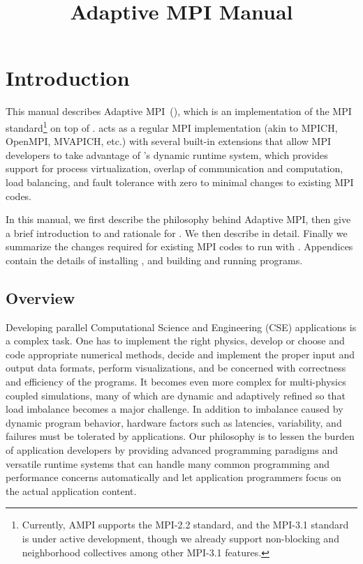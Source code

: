 \documentclass[10pt]{article}
\title{Adaptive MPI Manual}
\begin{document}
\maketitle

\section{Introduction}

This manual describes Adaptive MPI~(\ampi{}), which is an implementation of the
MPI standard\footnote{Currently, AMPI supports the MPI-2.2 standard, and the MPI-3.1 standard is under active development,
though we already support non-blocking and neighborhood collectives among other MPI-3.1 features.} on top of \charmpp{}.
\ampi{} acts as a regular MPI implementation (akin to MPICH, OpenMPI, MVAPICH, etc.)
with several built-in extensions that allow MPI developers to take advantage of \charmpp{}'s
dynamic runtime system, which provides support for process virtualization,
overlap of communication and computation, load balancing, and fault tolerance
with zero to minimal changes to existing MPI codes.

In this manual, we first describe the philosophy behind Adaptive MPI, then give a brief
introduction to \charmpp{} and rationale for \ampi{}. We then describe
\ampi{} in detail. Finally we summarize the changes required for existing MPI
codes to run with \ampi{}. Appendices contain the details of installing
\ampi{}, and building and running \ampi{} programs.

\subsection{Overview}

Developing parallel Computational Science and Engineering (CSE) applications is
a complex task. One has to implement the right physics, develop or choose and
code appropriate numerical methods, decide and implement the proper input and
output data formats, perform visualizations, and be concerned with correctness
and efficiency of the programs. It becomes even more complex for multi-physics
coupled simulations, many of which are dynamic and adaptively refined 
so that load imbalance becomes a major challenge. In addition to imbalance
caused by dynamic program behavior, hardware factors such as latencies,
variability, and failures must be tolerated by applications.
Our philosophy is to lessen the burden of application developers by
providing advanced programming paradigms and versatile runtime systems that can
handle many common programming and performance concerns automatically and let
application programmers focus on the actual application content.
\end{document}
